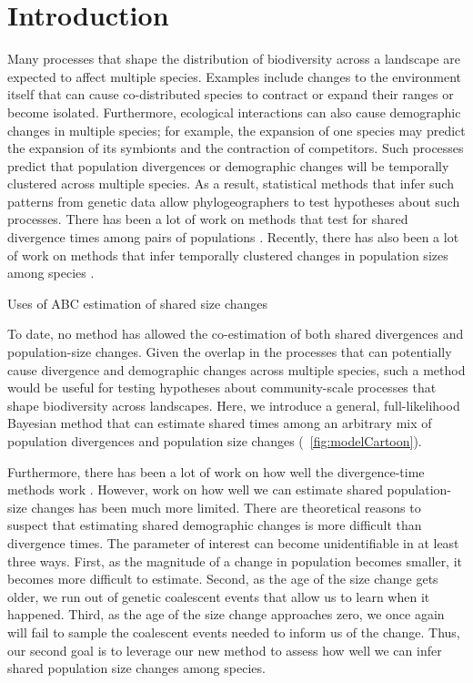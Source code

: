 \section{Introduction}

Many processes that shape the distribution of biodiversity across a landscape
are expected to affect multiple species.
Examples include changes to the environment itself that can cause
co-distributed species to contract or expand their ranges or become isolated.
Furthermore, ecological interactions can also cause demographic changes in
multiple species;
for example, the expansion of one species may predict the expansion of its
symbionts and the contraction of competitors.
Such processes predict that population divergences or demographic changes will
be temporally clustered across multiple species.
As a result, statistical methods that infer such patterns from genetic data
allow phylogeographers to test hypotheses about such processes.
There has been a lot of work on methods that test for shared divergence times
among pairs of populations
\citep{Hickerson2006,Hickerson2007,Huang2011,Oaks2014dpp,Oaks2018ecoevolity}.
Recently, there has also been a lot of work on methods that infer temporally
clustered changes in population sizes among species
\citep{Chan2014,Xue2015,Xue2017,Gehara2017}.

Uses of ABC estimation of shared size changes \citep{Burbrink2016}

To date, no method has allowed the co-estimation of both shared divergences
and population-size changes.
Given the overlap in the processes that can potentially cause divergence and
demographic changes across multiple species, such a method would be useful for
testing hypotheses about community-scale processes that shape biodiversity
across landscapes.
Here, we introduce a general, full-likelihood Bayesian method that can estimate
shared times among an arbitrary mix of population divergences and population
size changes (\fig{}~\ref{fig:modelCartoon}).

Furthermore, there has been a lot of work on how well the divergence-time
methods work
\citep{Oaks2012,Hickerson2013,Oaks2014reply,Oaks2014dpp,Overcast2017,Oaks2018ecoevolity}.
However, work on how well we can estimate shared population-size changes has
been much more limited.
There are theoretical reasons to suspect that estimating shared demographic
changes is more difficult than divergence times.
The parameter of interest can become unidentifiable in at least three ways.
First, as the magnitude of a change in population becomes smaller,
it becomes more difficult to estimate.
Second, as the age of the size change gets older, we run out of
genetic coalescent events that allow us to learn when it happened.
Third, as the age of the size change approaches zero, we once again will fail
to sample the coalescent events needed to inform us of the change.
Thus, our second goal is to leverage our new method to assess how well we can
infer shared population size changes among species.

